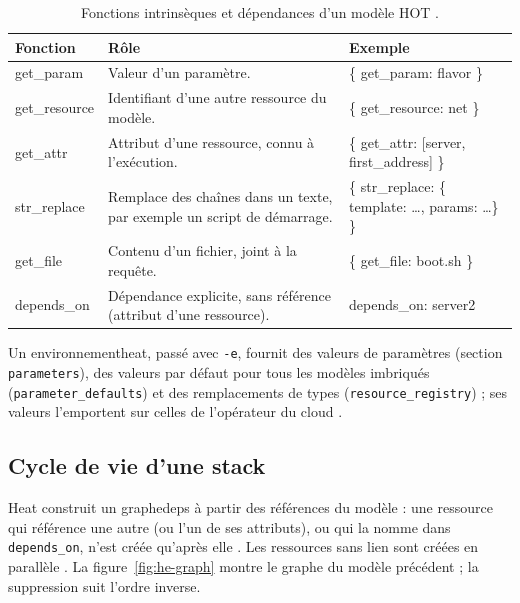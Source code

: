\begin{table}[!ht]
\centering
\renewcommand{\arraystretch}{1.3}
\begin{tabular}{@{}>{\raggedright\arraybackslash\ttfamily\small}p{3.0cm}>{\raggedright\arraybackslash}p{7.2cm}>{\raggedright\arraybackslash\ttfamily\small}p{5.3cm}@{}}
\toprule
\textrm{\textbf{Fonction}} & \textbf{Rôle} & \textrm{\textbf{Exemple}} \\
\midrule
get\_param & Valeur d'un paramètre. & \{ get\_param: flavor \} \\
get\_resource & Identifiant d'une autre ressource du modèle. & \{ get\_resource: net \} \\
get\_attr & Attribut d'une ressource, connu à l'exécution. & \{ get\_attr: [server, first\_address] \} \\
str\_replace & Remplace des chaînes dans un texte, par exemple un script de démarrage. & \{ str\_replace: \{ template: \dots, params: \dots \} \} \\
get\_file & Contenu d'un fichier, joint à la requête. & \{ get\_file: boot.sh \} \\
depends\_on & Dépendance explicite, sans référence (attribut d'une ressource). & depends\_on: server2 \\
\bottomrule
\end{tabular}
\caption{Fonctions intrinsèques et dépendances d'un modèle HOT \parencite{heat-hot-spec}.}
\label{tab:he-fonctions}
\end{table}

Un \gls{environnementheat}, passé avec \texttt{-e}, fournit des valeurs de paramètres (section \texttt{parameters}), des valeurs
par défaut pour tous les modèles imbriqués (\texttt{parameter\_\allowbreak defaults}) et des remplacements de types
(\texttt{resource\_\allowbreak registry}) ; ses valeurs l'emportent sur celles de l'opérateur du cloud \parencite{heat-environment}.

\subsection{Cycle de vie d'une stack}\label{sec:he-cycle}

Heat construit un \gls{graphedeps} à partir des références du modèle : une ressource qui référence une autre (ou l'un de
ses attributs), ou qui la nomme dans \texttt{depends\_on}, n'est créée qu'après elle \parencite{heat-glossary}. Les ressources
sans lien sont créées en parallèle \parencite{heat-environment}. La figure~\ref{fig:he-graph} montre le graphe du modèle
précédent ; la suppression suit l'ordre inverse.

